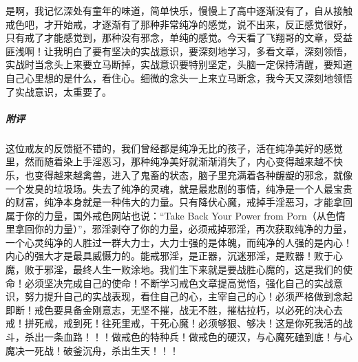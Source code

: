 \begin{case}
    是啊，我记忆深处有童年的味道，简单快乐，慢慢上了高中逐渐没有了，自从接触戒色吧，才开始戒，才逐渐有了那种非常纯净的感觉，说不出来，反正感觉很好，只有戒了才能感觉到，那种没有邪念，单纯的感觉。今天看了飞翔哥的文章，受益匪浅啊！让我明白了要有坚决的实战意识，要深刻地学习，多看文章，深刻领悟，实战时当念头上来要立马断掉，实战意识要特别坚定，头脑一定保持清醒，要知道自己心里想的是什么，看住心。细微的念头一上来立马断念，我今天又深刻地领悟了实战意识，太重要了。
    \subparagraph{附评} 这位戒友的反馈挺不错的，我们曾经都是纯净无比的孩子，活在纯净美好的感觉里，然而随着染上手淫恶习，那种纯净美好就渐渐消失了，内心变得越来越不快乐，也变得越来越禽兽，进入了鬼畜的状态，脑子里充满着各种龌龊的邪念，就像一个发臭的垃圾场。失去了纯净的灵魂，就是最悲剧的事情，纯净是一个人最宝贵的财富，纯净本身就是一种伟大的力量。只有降伏心魔，戒掉手淫恶习，才能拿回属于你的力量，国外戒色网站也说：“Take Back Your Power from Porn（从色情里拿回你的力量）”，邪淫剥夺了你的力量，必须戒掉邪淫，再次获取纯净的力量，一个心灵纯净的人胜过一群大力士，大力士强的是体魄，而纯净的人强的是内心！内心的强大才是最具威慑力的。能戒邪淫，是正器，沉迷邪淫，是败器！败于心魔，败于邪淫，最终人生一败涂地。我们生下来就是要战胜心魔的，这是我们的使命！必须坚决完成自己的使命！不断学习戒色文章提高觉悟，强化自己的实战意识，努力提升自己的实战表现，看住自己的心，主宰自己的心！必须严格做到念起即断！戒色要具备金刚意志，无坚不摧，战无不胜，摧枯拉朽，以必死的决心去戒！拼死戒，戒到死！往死里戒，干死心魔！必须够狠、够决！这是你死我活的战斗，杀出一条血路！！！做戒色的特种兵！做戒色的硬汉，与心魔死磕到底！与心魔决一死战！破釜沉舟，杀出生天！！！
\end{case}

